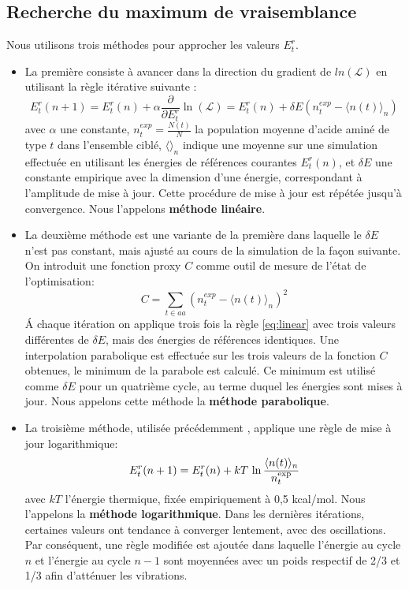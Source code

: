 \subsection{Recherche du maximum de vraisemblance}
Nous utilisons trois méthodes pour approcher les valeurs ${E^r_t}$.
\begin{itemize}
  \label{enumMeth}
\item La première consiste à avancer dans la direction du gradient de $ln(\mathcal{L})$ en utilisant la règle itérative suivante \cite{Kleinman06}: 
\begin{equation} \label {eq:linear}
  E^r_t(n+1) = E^r_t(n) + \alpha \frac{\partial}{\partial E^r_t} \ln(\mathcal{L})=E^r_t(n) + \delta E (n^{exp}_t - \langle n(t)\rangle_n)
\end{equation} 
avec $\alpha$ une constante, $n^{exp}_t = \frac{N(t)}{N}$ la population moyenne d'acide aminé de type $t$ dans l'ensemble ciblé, $\langle\rangle_n$ indique une moyenne sur une simulation effectuée en utilisant les énergies de références courantes ${E^r_t(n)}$, et $\delta E$ une constante empirique avec la dimension d'une énergie, correspondant à l'amplitude de mise à jour. Cette procédure de mise à jour est répétée jusqu'à convergence. Nous l'appelons \textbf{méthode linéaire}.
\item La deuxième méthode est une variante de la première dans laquelle le $\delta E$ n'est pas constant, mais ajusté au cours de la simulation de la façon suivante. On introduit une fonction proxy $C$ comme outil de mesure de l'état de l'optimisation:
\begin{equation} \label {eq:proxy_function}
C =\sum_{t \in aa}(n^{exp}_t - \langle n(t)\rangle_n )^2
\end{equation} 
\'A chaque itération on applique trois fois la règle \ref{eq:linear} avec trois valeurs différentes de $\delta E$, mais des énergies de références identiques. Une interpolation parabolique est effectuée sur les trois valeurs de la fonction $C$ obtenues, le minimum de la parabole est calculé. Ce minimum est utilisé comme $\delta E$ pour un quatrième cycle, au terme duquel les énergies sont mises à jour. Nous appelons cette méthode la \textbf{méthode parabolique}.
\item La troisième méthode, utilisée précédemment \cite{Schmidt08, Simonson13b}, applique une règle de mise à jour logarithmique:
\begin{equation} \label{eq:log}
E^r_t (n+1) = E^r_t (n) + kT \, \ln \frac{\langle n(t) \rangle_n}{n_t^{\rm exp}}
\end{equation}
avec $kT$ l'énergie thermique, fixée empiriquement à 0,5 kcal/mol. Nous l'appelons la \textbf{méthode logarithmique}. Dans les dernières itérations, certaines valeurs ont tendance à converger lentement, avec des oscillations. Par conséquent, une règle modifiée est ajoutée dans laquelle l'énergie au cycle $n$ et l'énergie au cycle  $n-1$ sont moyennées avec un poids respectif de 2/3 et 1/3 afin d'atténuer les vibrations.

\end{itemize}

